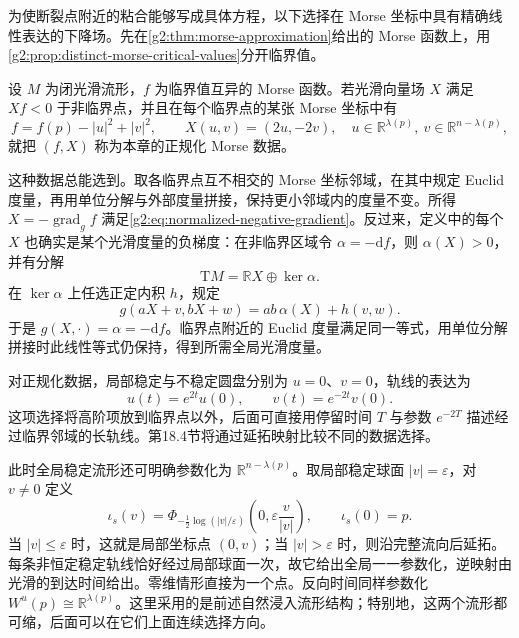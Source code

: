 为使断裂点附近的粘合能够写成具体方程，以下选择在 Morse 坐标中具有精确线性表达的下降场。先在\cref{g2:thm:morse-approximation}给出的 Morse 函数上，用\cref{g2:prop:distinct-morse-critical-values}分开临界值。

\begin{definition}\label{g2:def:normalized-morse-data}
	设 \(M\) 为闭光滑流形，\(f\) 为临界值互异的 Morse 函数。若光滑向量场 \(X\) 满足 \(Xf<0\) 于非临界点，并且在每个临界点的某张 Morse 坐标中有
	\begin{equation}\label{g2:eq:normalized-negative-gradient}
		f=f(p)-|u|^2+|v|^2,\qquad
		X(u,v)=(2u,-2v),
		\quad u\in\mathbb R^{\lambda(p)},\ v\in\mathbb R^{n-\lambda(p)},
	\end{equation}
	就把 \((f,X)\) 称为本章的正规化 Morse 数据。
\end{definition}

这种数据总能选到。取各临界点互不相交的 Morse 坐标邻域，在其中规定 Euclid 度量，再用单位分解与外部度量拼接，保持更小邻域内的度量不变。所得 \(X=-\operatorname{grad}_g f\) 满足\eqref{g2:eq:normalized-negative-gradient}。反过来，定义中的每个 \(X\) 也确实是某个光滑度量的负梯度：在非临界区域令 \(\alpha=-\mathrm df\)，则 \(\alpha(X)>0\)，并有分解
\[
	\mathrm TM=\mathbb RX\oplus\ker\alpha.
\]
在 \(\ker\alpha\) 上任选正定内积 \(h\)，规定
\[
	g(aX+v,bX+w)=ab\,\alpha(X)+h(v,w).
\]
于是 \(g(X,\cdot)=\alpha=-\mathrm df\)。临界点附近的 Euclid 度量满足同一等式，用单位分解拼接时此线性等式仍保持，得到所需全局光滑度量。

\ProseParagraphBreak

对正规化数据，局部稳定与不稳定圆盘分别为 \(u=0\)、\(v=0\)，轨线的表达为
\[
	u(t)=e^{2t}u(0),\qquad v(t)=e^{-2t}v(0).
\]
这项选择将高阶项放到临界点以外，后面可直接用停留时间 \(T\) 与参数 \(e^{-2T}\) 描述经过临界邻域的长轨线。第18.4节将通过延拓映射比较不同的数据选择。

\ProseParagraphBreak

此时全局稳定流形还可明确参数化为 \(\mathbb R^{n-\lambda(p)}\)。取局部稳定球面 \(|v|=\varepsilon\)，对 \(v\ne0\) 定义
\[
	\iota_s(v)=\Phi_{-\frac12\log(|v|/\varepsilon)}
	\left(0,\varepsilon\frac{v}{|v|}\right),\qquad \iota_s(0)=p.
\]
当 \(|v|\le\varepsilon\) 时，这就是局部坐标点 \((0,v)\)；当 \(|v|>\varepsilon\) 时，则沿完整流向后延拓。每条非恒定稳定轨线恰好经过局部球面一次，故它给出全局一一参数化，逆映射由光滑的到达时间给出。零维情形直接为一个点。反向时间同样参数化 \(W^u(p)\cong\mathbb R^{\lambda(p)}\)。这里采用的是前述自然浸入流形结构；特别地，这两个流形都可缩，后面可以在它们上面连续选择方向。

